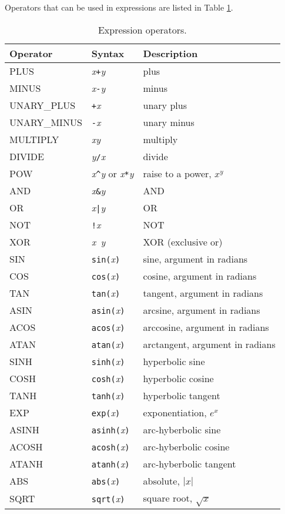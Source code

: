 Operators that can be used in expressions are listed in Table
\ref{table:expression:operators}.
\clearpage
\begin{table}
\caption{Expression operators.\label{table:expression:operators}}
\begin{center}
\begin{tabular}{|l|l|l|}
\hline
{\bf Operator }	& {\bf   Syntax } & {\bf Description}  \\
\hline
PLUS		& {\it x}{\tt +}{\it y}		& plus \\
MINUS		& {\it x}{\tt -}{\it y}		& minus \\
UNARY\_PLUS	& {\tt +}{\it x}            & unary plus \\
UNARY\_MINUS	& {\tt -}{\it x}            & unary minus \\
MULTIPLY	& {\it x}{\tt *}{\it y}		& multiply \\
DIVIDE		& {\it y}{\tt /}{\it x}	        & divide \\
POW		& {\it x}{\tt \^{ }}{\it y}  or
                  {\it x}{\tt **}{\it y} & raise to a power, $x^y$ \\
AND		& {\it x}{\tt \&}{\it y}           & AND \\
OR		& {\it x}{\tt |}{\it y}           & OR \\
NOT		& {\tt !}{\it x}		& NOT \\
XOR		& {\it x}{\tt ~}{\it y}		& XOR (exclusive or) \\
SIN		& {\tt sin(}{\it x}{\tt )}	& sine, argument in radians \\
COS		& {\tt cos(}{\it x}{\tt )}	& cosine, argument in radians \\
TAN		& {\tt tan(}{\it x}{\tt )}& tangent, argument in radians \\
ASIN		& {\tt asin(}{\it x}{\tt )}& arcsine, argument in radians \\
ACOS		& {\tt acos(}{\it x}{\tt )}& arccosine, argument in radians \\
ATAN		& {\tt atan(}{\it x}{\tt )}& arctangent, argument in radians \\
SINH		& {\tt sinh(}{\it x}{\tt )}	& hyperbolic sine \\
COSH		& {\tt cosh(}{\it x}{\tt )}	& hyperbolic cosine \\
TANH		& {\tt tanh(}{\it x}{\tt )}	& hyperbolic tangent \\
EXP		& {\tt exp(}{\it x}{\tt )}	& exponentiation, $e^x$ \\
ASINH		& {\tt asinh(}{\it x}{\tt )}& arc-hyberbolic sine \\
ACOSH		& {\tt acosh(}{\it x}{\tt )}& arc-hyberbolic cosine \\
ATANH		& {\tt atanh(}{\it x}{\tt )}& arc-hyberbolic tangent \\
ABS		& {\tt abs(}{\it x}{\tt )}	& absolute, $|x|$ \\
SQRT		& {\tt sqrt(}{\it x}{\tt )}	& square root, $\sqrt{x}$ \\
\hline
\end{tabular}
\end{center}
\end{table}
